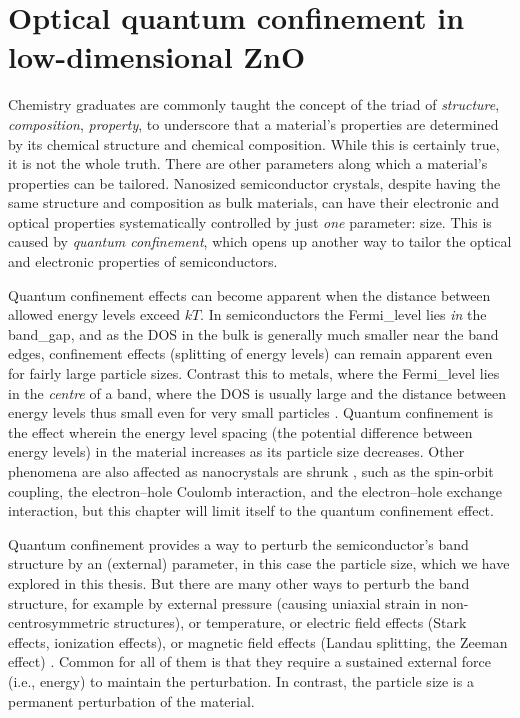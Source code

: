 \documentclass[draft,webedition,openright,titles,swedish,english]{LuaUUThesis}\usepackage[]{graphicx}\usepackage[]{xcolor}
\newcommand{\ie}{i.e.}
\begin{document}
%

\chapter{Optical quantum confinement in low-dimensional ZnO}
\label{ch:quantum-confinement}

Chemistry graduates are commonly taught the concept of the triad of
\emph{structure}, \emph{composition}, \emph{property},
to underscore that a material's properties are determined by its
chemical structure and chemical composition.
While this is certainly true, it is not the whole truth.
There are other parameters along which a material's properties can
be tailored.
Nanosized semiconductor crystals, despite having the same structure and composition
as bulk materials, can have their electronic and optical properties
systematically controlled by just \emph{one} parameter: size.
This is caused by \emph{quantum confinement}, which opens up another way to tailor
the optical and electronic properties of semiconductors.

Quantum confinement effects can become apparent when the distance between allowed
energy levels exceed $kT$.
In semiconductors the \gls{Fermi_level} lies \emph{in} the \gls{band_gap},
and as the \gls{DOS} in the bulk is generally much smaller near the band edges,
confinement effects (splitting of energy levels) can remain apparent even for fairly
large particle sizes.
Contrast this to metals, where the \gls{Fermi_level} lies in the \emph{centre} of a band,
where the \gls{DOS} is usually large and the distance between energy levels
thus small even for very small particles \cite{Delerue2004}.
%
Quantum confinement is the effect wherein the energy level spacing (the potential difference
between energy levels) in the material increases as its particle size decreases.
Other phenomena are also affected as nanocrystals are shrunk \cite[p.\ 114]{Delerue2004},
such as
the spin-orbit coupling,
the electron--hole Coulomb interaction, and
the electron--hole exchange interaction,
but this chapter will limit itself to the quantum confinement effect.

Quantum confinement provides a way to perturb the semiconductor's band structure
by an (external) parameter, in this case the particle size,
which we have explored in this thesis.
But there are many other ways to perturb the band structure, for example by
external pressure (causing uniaxial strain in non-centrosymmetric structures),
or temperature, or electric field effects (Stark effects, ionization effects),
or magnetic field effects (Landau splitting, the Zeeman effect) \cite{Pankove1975}.
Common for all of them is that they require a sustained external force
(\ie, energy) to maintain the perturbation.
In contrast, the particle size is a permanent perturbation
of the material.
\end{document}
